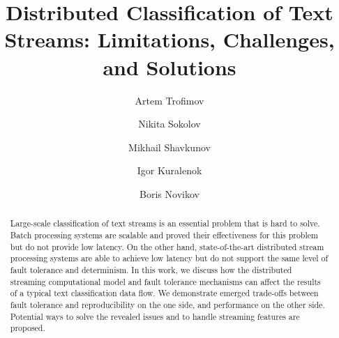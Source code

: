 \documentclass[sigconf]{acmart}
\theoremstyle{remark}
\begin{document}

\title {Distributed Classification of Text Streams: Limitations, Challenges, and Solutions}


\author{Artem Trofimov}

\author{Nikita Sokolov}

\author{Mikhail Shavkunov}

\author{Igor Kuralenok}

\author{Boris Novikov}

\begin{abstract}

Large-scale classification of text streams is an essential problem that is hard to solve. Batch processing systems are scalable and proved their effectiveness for this problem but do not provide low latency. On the other hand, state-of-the-art distributed stream processing systems are able to achieve low latency but do not support the same level of fault tolerance and determinism. In this work, we discuss how the distributed streaming computational model and fault tolerance mechanisms can affect the results of a typical text classification data flow. We demonstrate emerged trade-offs between fault tolerance and reproducibility on the one side, and performance on the other side. Potential ways to solve the revealed issues and to handle streaming features are proposed.

\end{abstract}
\end{document}

